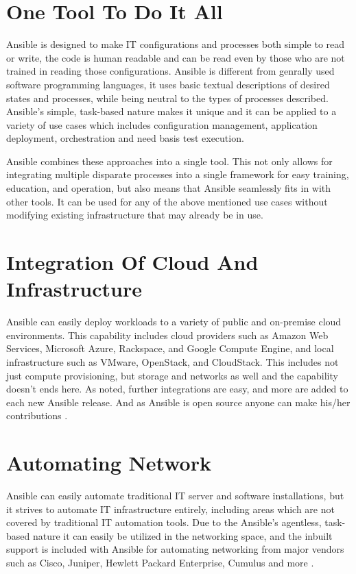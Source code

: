 \documentclass[9pt,twocolumn,twoside]{styles/osajnl}
\begin{document}
\section{One Tool To Do It All}

Ansible is designed to make IT configurations and processes both
simple to read or write, the code is human readable and can be read
even by those who are not trained in reading those
configurations. Ansible is different from genrally used software
programming languages, it uses basic textual descriptions of desired
states and processes, while being neutral to the types of processes
described. Ansible’s simple, task-based nature makes it unique and it
can be applied to a variety of use cases which includes configuration
management, application deployment, orchestration and need basis test
execution.

Ansible combines these approaches into a single tool. This not only
allows for integrating multiple disparate processes into a single
framework for easy training, education, and operation, but also means
that Ansible seamlessly fits in with other tools. It can be used for
any of the above mentioned use cases without modifying existing
infrastructure that may already be in use.

\section{Integration Of Cloud And Infrastructure}

Ansible can easily deploy workloads to a variety of public and
on-premise cloud environments. This capability includes cloud
providers such as Amazon Web Services, Microsoft Azure, Rackspace, and
Google Compute Engine, and local infrastructure such as VMware,
OpenStack, and CloudStack. This includes not just compute
provisioning, but storage and networks as well and the capability
doesn't ends here. As noted, further integrations are easy, and more
are added to each new Ansible release. And as Ansible is open source
anyone can make his/her contributions \cite{www-ansible}.

\section{Automating Network}

Ansible can easily automate traditional IT server and software
installations, but it strives to automate IT infrastructure entirely,
including areas which are not covered by traditional IT automation
tools. Due to the Ansible’s agentless, task-based nature it can easily
be utilized in the networking space, and the inbuilt support is
included with Ansible for automating networking from major vendors
such as Cisco, Juniper, Hewlett Packard Enterprise, Cumulus and
more \cite{www-ansible3}.
\end{document}
